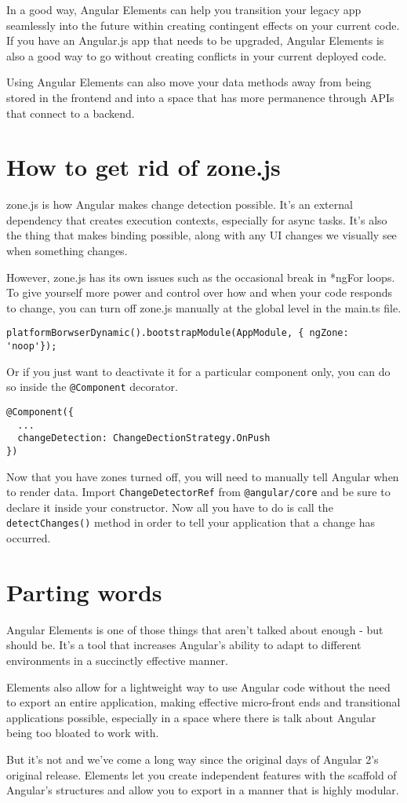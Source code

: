 In a good way, Angular Elements can help you transition your legacy app seamlessly into the future within creating contingent effects on your current code. If you have an Angular.js app that needs to be upgraded, Angular Elements is also a good way to go without creating conflicts in your current deployed code. 

Using Angular Elements can also move your data methods away from being stored in the frontend and into a space that has more permanence through APIs that connect to a backend. 

\section{How to get rid of zone.js}
zone.js is how Angular makes change detection possible. It's an external dependency that creates execution contexts, especially for async tasks. It's also the thing that makes binding possible, along with any UI changes we visually see when something changes.

However, zone.js has its own issues such as the occasional break in *ngFor loops. To give yourself more power and control over how and when your code responds to change, you can turn off zone.js manually at the global level in the main.ts file.

\begin{verbatim}
platformBorwserDynamic().bootstrapModule(AppModule, { ngZone: 'noop'});  
\end{verbatim}

Or if you just want to deactivate it for a particular component only, you can do so inside the \lstinline{@Component} decorator. 

\begin{verbatim}
@Component({
  ...
  changeDetection: ChangeDectionStrategy.OnPush
})  
\end{verbatim}

Now that you have zones turned off, you will need to manually tell Angular when to render data. Import \lstinline{ChangeDetectorRef} from \lstinline{@angular/core} and be sure to declare it inside your constructor. Now all you have to do is call the \lstinline{detectChanges()} method in order to tell your application that a change has occurred.

\section{Parting words}
Angular Elements is one of those things that aren't talked about enough - but should be. It's a tool that increases Angular's ability to adapt to different environments in a succinctly effective manner. 

Elements also allow for a lightweight way to use Angular code without the need to export an entire application, making effective micro-front ends and transitional applications possible, especially in a space where there is talk about Angular being too bloated to work with. 

But it's not and we've come a long way since the original days of Angular 2's original release. Elements let you create independent features with the scaffold of Angular's structures and allow you to export in a manner that is highly modular. 